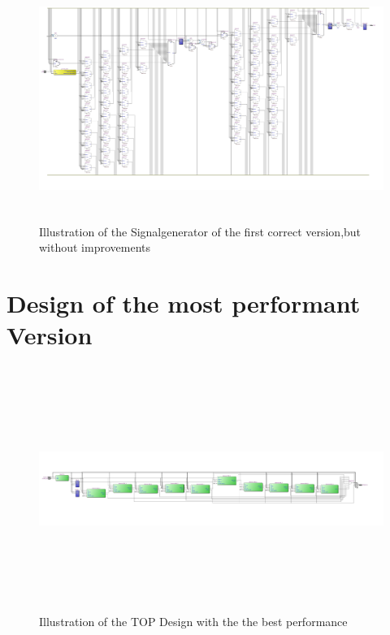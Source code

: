 \begin{figure}[]
\centering
\includegraphics[width=650px,height=300px,angle=-90]{../../pictures/20.02.2014/signalgenerator_signalgenerator_top.jpg}
\caption[Signalgenerator of the First Version]{Illustration of the Signalgenerator of the first correct version,but without improvements}
\label{fig:version:one:sig}
\end{figure}

\section{Design of the most performant Version}
\label{appendix:3:section:2}


\begin{figure}[]
\centering
\includegraphics[width=650px,height=300px,angle=-90]{../../pictures/13.06.2014/plain_generator/200Mhz/10OBS/TOP_only_10Observer.jpg}
\caption[TOP Design of the Final Version]{Illustration of the TOP Design with the the best performance}
\label{fig:version:final:top}
\end{figure}

